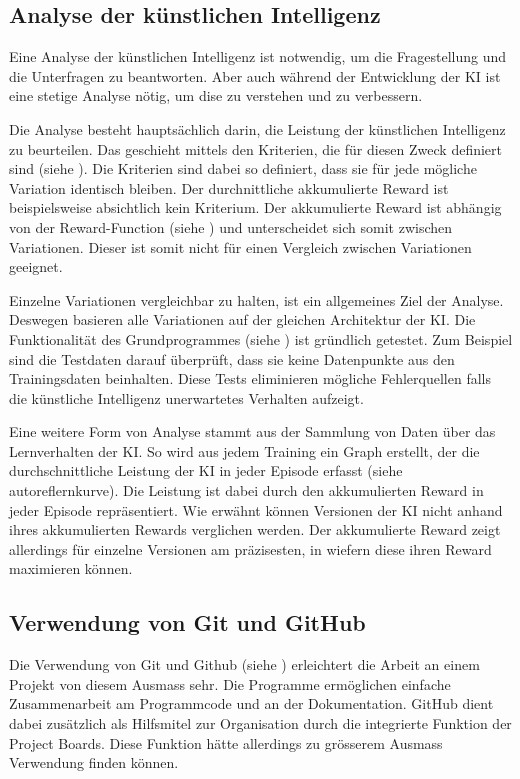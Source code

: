 \subsection{Analyse der künstlichen Intelligenz}\label{sub:d_reflex_analys} Eine
Analyse der künstlichen Intelligenz ist notwendig, um die Fragestellung und die
Unterfragen zu beantworten. Aber auch während der Entwicklung der KI ist eine
stetige Analyse nötig, um dise zu verstehen und zu verbessern.

Die Analyse besteht hauptsächlich darin, die Leistung der künstlichen
Intelligenz zu beurteilen. Das geschieht mittels den Kriterien, die für diesen
Zweck definiert sind (siehe ). Die Kriterien sind dabei so
definiert, dass sie für jede mögliche Variation identisch bleiben. Der
durchnittliche akkumulierte Reward ist beispielsweise absichtlich kein
Kriterium. Der akkumulierte Reward  ist abhängig von der Reward-Function (siehe
) und unterscheidet sich somit zwischen Variationen.
Dieser ist somit nicht für einen Vergleich zwischen Variationen geeignet.

Einzelne Variationen vergleichbar zu halten, ist ein allgemeines Ziel der
Analyse. Deswegen basieren alle Variationen auf der gleichen Architektur der KI.
Die Funktionalität des Grundprogrammes (siehe ) ist
gründlich getestet. Zum Beispiel sind die Testdaten darauf überprüft, dass sie
keine Datenpunkte aus den Trainingsdaten beinhalten. Diese Tests eliminieren
mögliche Fehlerquellen falls die künstliche Intelligenz unerwartetes Verhalten
aufzeigt.

Eine weitere Form von Analyse stammt aus der Sammlung von Daten über das
Lernverhalten der KI. So wird aus jedem Training ein Graph erstellt, der die
durchschnittliche Leistung der KI in jeder Episode erfasst (siehe
autoref{lernkurve}). Die Leistung ist dabei durch den akkumulierten Reward in
jeder Episode repräsentiert. Wie erwähnt können Versionen der KI nicht anhand
ihres akkumulierten Rewards verglichen werden. Der akkumulierte Reward zeigt
allerdings für einzelne Versionen am präzisesten, in wiefern diese ihren Reward
maximieren können.


\subsection{Verwendung von Git und GitHub}\label{sub:d_reflex_git} Die
Verwendung von Git und Github (siehe ) erleichtert die
Arbeit an einem Projekt von diesem Ausmass sehr. Die Programme ermöglichen
einfache Zusammenarbeit am Programmcode und an der Dokumentation. GitHub dient
dabei zusätzlich als Hilfsmitel zur Organisation durch die integrierte Funktion
der Project Boards. Diese Funktion hätte allerdings zu grösserem Ausmass
Verwendung finden können.

